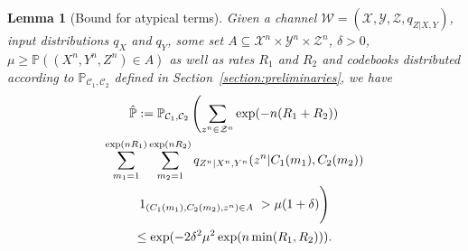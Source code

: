 \documentclass[journal]{IEEEtran}
\newcommand{\lemmaconst}{\delta}
\newcommand{\channelpmf}{q}
\newcommand{\codebookRateOne}{R_1}
\newcommand{\codebookRateTwo}{R_2}
\newcommand{\channelInOne}{X}
\newcommand{\channelInOneAlph}{\mathcal{X}}
\newcommand{\channelInTwo}{Y}
\newcommand{\channelInTwoAlph}{\mathcal{Y}}
\newcommand{\channelOut}{Z}
\newcommand{\channelOutAlph}{\mathcal{Z}}
\newcommand{\channelOutAlphElement}{z}
\newcommand{\channel}{\mathcal{W}}
\newcommand{\alphSubset}{A}
\newcommand{\codebookOne}{\mathcal{C}_1}
\newcommand{\codebookTwo}{\mathcal{C}_2}
\newcommand{\codebookOneWord}[1]{C_1(#1)}
\newcommand{\codebookTwoWord}[1]{C_2(#1)}
\newcommand{\codewordIndex}{m}
\newcommand{\codebookBlocklength}{n}
\newcommand{\Probability}{\mathbb{P}}
\newcommand{\indicator}[1]{1_{#1}}
\newcommand{\lemmaexpectation}{\mu}
\newtheorem{lemma}{Lemma}
\begin{document}
\begin{lemma}[Bound for atypical terms]
\label{lemma:soft-covering-two-transmitters-atypical}
Given a channel
$\channel = (\channelInOneAlph, \channelInTwoAlph, \channelOutAlph, \channelpmf_{\channelOut | \channelInOne, \channelInTwo})$,
input distributions $\channelpmf_\channelInOne$ and $\channelpmf_\channelInTwo$, some set $\alphSubset \subseteq \channelInOneAlph^\codebookBlocklength \times \channelInTwoAlph^\codebookBlocklength \times \channelOutAlph^\codebookBlocklength$, $\lemmaconst > 0$, $\lemmaexpectation \geq \Probability((\channelInOne^\codebookBlocklength, \channelInTwo^\codebookBlocklength, \channelOut^\codebookBlocklength) \in \alphSubset)$ as well as rates $\codebookRateOne$ and $\codebookRateTwo$ and codebooks distributed according to $\Probability_{\codebookOne, \codebookTwo}$ defined in Section~\ref{section:preliminaries}, we have
\begin{multline*}
\hat{\Probability} :=
\Probability_{\codebookOne,\codebookTwo}\left(
  \sum\limits_{\channelOutAlphElement^\codebookBlocklength \in \channelOutAlph^\codebookBlocklength}
  \exp(-\codebookBlocklength(\codebookRateOne+\codebookRateTwo))
  \right.
  \\
  \sum\limits_{\codewordIndex_1=1}^{\exp(\codebookBlocklength\codebookRateOne)}
  \sum\limits_{\codewordIndex_2=1}^{\exp(\codebookBlocklength\codebookRateTwo)}
      \channelpmf_{\channelOut^\codebookBlocklength | \channelInOne^\codebookBlocklength, \channelInTwo^\codebookBlocklength}(\channelOutAlphElement^\codebookBlocklength | \codebookOneWord{\codewordIndex_1}, \codebookTwoWord{\codewordIndex_2})
      \\
      \indicator{(\codebookOneWord{\codewordIndex_1}, \codebookTwoWord{\codewordIndex_2}, \channelOutAlphElement^\codebookBlocklength) \in \alphSubset}
  \left. \vphantom{\sum\limits_{\channelOutAlphElement^\codebookBlocklength \in \channelOutAlph^\codebookBlocklength}} >
  \lemmaexpectation(1+\lemmaconst)
\right) \\
\leq
\exp(-2 \lemmaconst^2 \lemmaexpectation^2 \exp(\codebookBlocklength\min(\codebookRateOne,\codebookRateTwo))).
\end{multline*}
\end{lemma}
\end{document}
